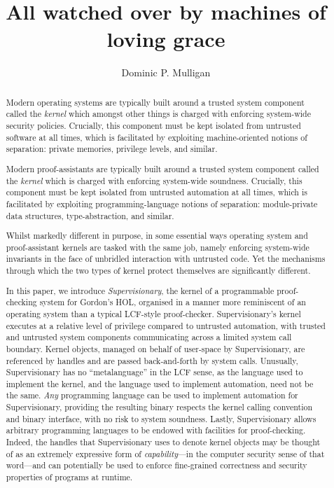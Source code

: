 \documentclass[a4paper, UKenglish, cleveref, autoref, thm-restate, colorlinks]{lipics-v2021}
\title{All watched over by machines of loving grace}
\author{Dominic P. Mulligan}{Automated Reasoning Group, Amazon Web Services, Cambridge, United Kingdom\footnote{All work done whilst employed within the Systems Research Group, Arm Research, Cambridge} \and \url{www.dominic-mulligan.co.uk}}{dominic.p.mulligan@gmail.com}{}{}
\begin{document}
\maketitle

\begin{abstract}
Modern operating systems are typically built around a trusted system component called the \emph{kernel} which amongst other things is charged with enforcing system-wide security policies.
Crucially, this component must be kept isolated from untrusted software at all times, which is facilitated by exploiting machine-oriented notions of separation: private memories, privilege levels, and similar.

Modern proof-assistants are typically built around a trusted system component called the \emph{kernel} which is charged with enforcing system-wide soundness.
Crucially, this component must be kept isolated from untrusted automation at all times, which is facilitated by exploiting programming-language notions of separation: module-private data structures, type-abstraction, and similar.

Whilst markedly different in purpose, in some essential ways operating system and proof-assistant kernels are tasked with the same job, namely enforcing system-wide invariants in the face of unbridled interaction with untrusted code.  Yet the mechanisms through which the two types of kernel protect themselves are significantly different.

In this paper, we introduce \emph{Supervisionary}, the kernel of a programmable proof-checking system for Gordon's HOL, organised in a manner more reminiscent of an operating system than a typical LCF-style proof-checker.
Supervisionary's kernel executes at a relative level of privilege compared to untrusted automation, with trusted and untrusted system components communicating across a limited system call boundary.
Kernel objects, managed on behalf of user-space by Supervisionary, are referenced by handles and are passed back-and-forth by system calls.
Unusually, Supervisionary has no ``metalanguage'' in the LCF sense, as the language used to implement the kernel, and the language used to implement automation, need not be the same.
\emph{Any} programming language can be used to implement automation for Supervisionary, providing the resulting binary respects the kernel calling convention and binary interface, with no risk to system soundness.
Lastly, Supervisionary allows arbitrary programming languages to be endowed with facilities for proof-checking.
Indeed, the handles that Supervisionary uses to denote kernel objects may be thought of as an extremely expressive form of \emph{capability}---in the computer security sense of that word---and can potentially be used to enforce fine-grained correctness and security properties of programs at runtime.
\end{abstract}
\end{document}
